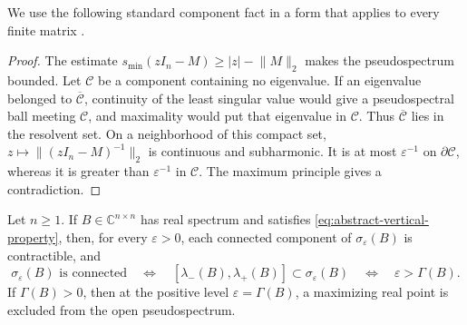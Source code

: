 \documentclass[10pt,twoside]{siamart1116}
\numberwithin{equation}{section}
\newcommand{\C}{\mathbb C}
\begin{document}
We use the following standard component fact in a form that applies to every
finite matrix \cite{BurkeLewisOverton2003,TrefethenEmbree2005}.


\begin{proof}
The estimate
\(s_{\min}(zI_n-M)\geq |z|-\lVert M\rVert_2\) makes the pseudospectrum
bounded.  Let \(\mathcal C\) be a component containing no eigenvalue.  If an
eigenvalue belonged to \(\overline{\mathcal C}\), continuity of the least
singular value would give a pseudospectral ball meeting \(\mathcal C\), and
maximality would put that eigenvalue in \(\mathcal C\).  Thus
\(\overline{\mathcal C}\) lies in the resolvent set.  On a neighborhood of
this compact set, \(z\mapsto\lVert(zI_n-M)^{-1}\rVert_2\) is continuous and
subharmonic.  It is at most \(\varepsilon^{-1}\) on
\(\partial\mathcal C\), whereas it is greater than
\(\varepsilon^{-1}\) in \(\mathcal C\).  The maximum principle gives a
contradiction.
\end{proof}

\begin{theorem}\label{thm:vertical-topology}
Let \(n\geq1\).  If \(B\in\C^{n\times n}\) has real spectrum and satisfies
\eqref{eq:abstract-vertical-property}, then, for every
\(\varepsilon>0\), each connected component of
\(\sigma_\varepsilon(B)\) is contractible, and
\begin{equation}\label{eq:abstract-connectedness}
 \sigma_\varepsilon(B)\text{ is connected}
 \quad\Longleftrightarrow\quad
 [\lambda_-(B),\lambda_+(B)]\subset\sigma_\varepsilon(B)
 \quad\Longleftrightarrow\quad
 \varepsilon>\Gamma(B).
\end{equation}
If \(\Gamma(B)>0\), then at the positive level
\(\varepsilon=\Gamma(B)\), a maximizing real point is excluded from the
open pseudospectrum.
\end{theorem}
\end{document}
